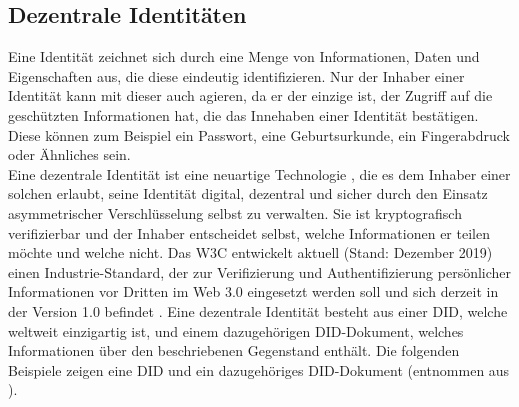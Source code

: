
\subsection{Dezentrale Identitäten}
\label{subsec:fundamentals:dlt:did}
Eine Identität zeichnet sich durch eine Menge von Informationen, Daten und Eigenschaften aus, die diese eindeutig identifizieren. Nur der Inhaber einer Identität kann mit dieser auch agieren, da er der einzige ist, der Zugriff auf die geschützten Informationen hat, die das Innehaben einer Identität bestätigen. Diese können zum Beispiel ein Passwort, eine Geburtsurkunde, ein Fingerabdruck oder Ähnliches sein.\\
Eine dezentrale Identität ist eine neuartige Technologie \cite{DID2007}, die es dem Inhaber einer solchen erlaubt, seine Identität digital, dezentral und sicher durch den Einsatz asymmetrischer Verschlüsselung selbst zu verwalten. Sie ist kryptografisch verifizierbar und der Inhaber entscheidet selbst, welche Informationen er teilen möchte und welche nicht. Das \ac{W3C} entwickelt aktuell (Stand: Dezember 2019) einen Industrie-Standard, der zur Verifizierung und Authentifizierung persönlicher Informationen vor Dritten im Web 3.0 eingesetzt werden soll und sich derzeit in der Version 1.0 befindet \cite{did2019}. Eine dezentrale Identität besteht aus einer \ac{DID}, welche weltweit einzigartig ist, und einem dazugehörigen DID-Dokument, welches Informationen über den beschriebenen Gegenstand enthält. Die folgenden Beispiele zeigen eine \ac{DID} und ein dazugehöriges DID-Dokument (entnommen aus \cite{did2019}).

